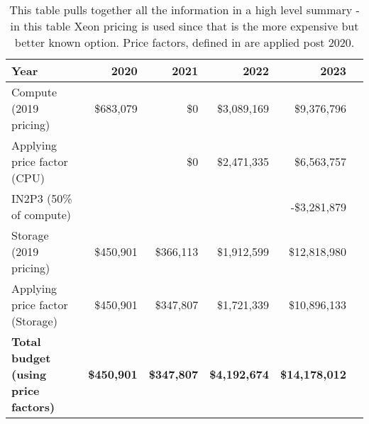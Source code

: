 \tiny \begin{longtable} { |p{}  |r  |r  |r  |r  |r |} 
\caption{This table pulls together all the information in a high level summary - in this table Xeon pricing is used since that is the more expensive but better known option. Price factors, defined in  are applied post 2020.
 \label{tab:Summary}}\\ 
\hline 
\textbf{Year}&\textbf{2020}&\textbf{2021}&\textbf{2022}&\textbf{2023} \\ \hline
{Compute (2019 pricing)}&{\$683,079}&{\$0}&{\$3,089,169}&{\$9,376,796} \\ \hline
{Applying price factor (CPU)}&{}&{\$0}&{\$2,471,335}&{\$6,563,757} \\ \hline
{IN2P3 (50\% of compute)}&{}&{}&{}&{-\$3,281,879} \\ \hline
{Storage (2019 pricing)}&{\$450,901}&{\$366,113}&{\$1,912,599}&{\$12,818,980} \\ \hline
{Applying price factor (Storage)}&{\$450,901}&{\$347,807}&{\$1,721,339}&{\$10,896,133} \\ \hline
\textbf{Total budget (using price factors)}&\textbf{\$450,901}&\textbf{\$347,807}&\textbf{\$4,192,674}&\textbf{\$14,178,012} \\ \hline
\end{longtable} \normalsize
